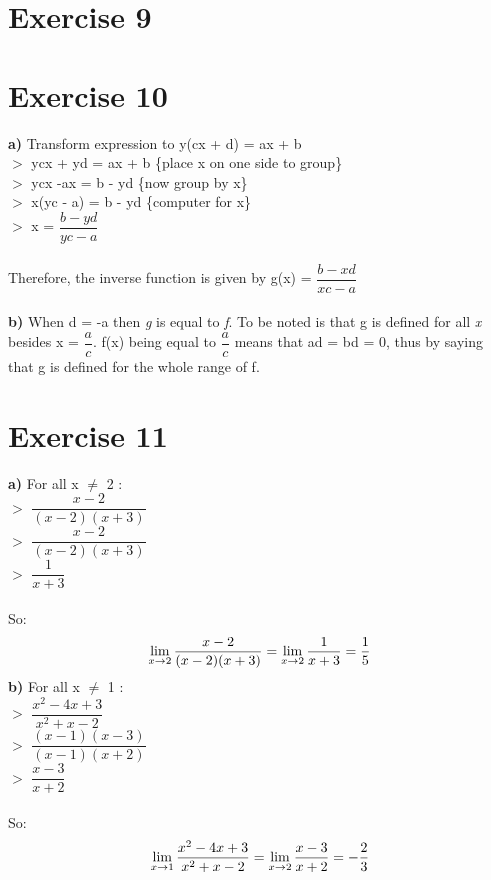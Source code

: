 \documentclass{article}
\begin{document}
  \section*{Exercise 9}
  \section*{Exercise 10}
  \textbf{a)} Transform expression to y(cx + d) = ax + b \\
  $>$ ycx + yd = ax + b \{place x on one side to group\} \\ 
  $>$ ycx -ax = b - yd  \{now group by x\} \\
  $>$ x(yc - a) = b - yd \{computer for x\} \\
  $>$ x = $\dfrac{b-yd}{yc-a}$ \\ \\
  Therefore, the inverse function is given by g(x) = $\dfrac{b-xd}{xc-a}$ \\ \\
  \textbf{b)} When d = -a then \textit{g} is equal to \textit{f}. To be noted is that g is defined for all \textit{x} besides x = $\dfrac{a}{c}$. f(x) being equal to $\dfrac{a}{c}$ means that ad = bd = 0, thus by saying that g is defined for the whole range of f.
   
  
  \section*{Exercise 11}
  
  \textbf{a)} For all x $\neq$ 2 : \\ 
  $>$ $\dfrac{x-2}{(x-2)(x+3)}$ \\
  $>$ $\dfrac{x-2}{(x-2)(x+3)}$ \\
  $>$ $\dfrac{1}{x+3}$ \\ \\
  So: 
  $$\lim_{x\to2} \dfrac{x-2}{(x-2)(x+3)} = \lim_{x\to2} \\ \\ \dfrac{1}{x+3} = \dfrac{1}{5}$$
  \textbf{b)} For all x $\neq$ 1 : \\
  $>$ $\dfrac{x^2 -4x + 3}{x^2 + x - 2}$ \\
  $>$ $\dfrac{(x-1)(x-3)}{(x-1)(x+2)}$ \\
  $>$ $\dfrac{x-3}{x+2}$ \\ \\
  So:
  $$\lim_{x\to1} \dfrac{x^2 -4x + 3}{x^2 + x - 2} = \lim_{x\to2} \\ \\ \dfrac{x-3}{x+2} = -\dfrac{2}{3}$$
  
  
\end{document}
